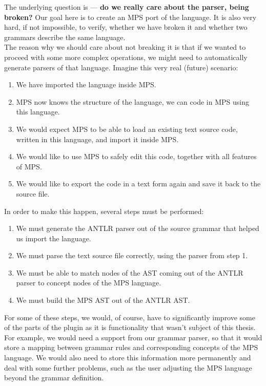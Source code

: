 The underlying question is --- \textbf{do we really care about the parser, being broken?}
Our goal here is to create an MPS port of the language.
It is also very hard, if not impossible, to verify, whether we have broken it and whether two grammars describe the same language.
\\

The reason why we should care about not breaking it is that if we wanted to proceed with some more complex operations, we might need to automatically generate parsers of that language.
Imagine this very real (future) scenario:

\begin{enumerate}
	\item We have imported the language inside MPS.

	\item MPS now knows the structure of the language, we can code in MPS using this language.

	\item We would expect MPS to be able to load an existing text source code, written in this language, and import it inside MPS.

	\item We would like to use MPS to safely edit this code, together with all features of MPS.

	\item We would like to export the code in a text form again and save it back to the source file.
\end{enumerate}

\noindent
In order to make this happen, several steps must be performed:

\begin{enumerate}
	\item We must generate the ANTLR parser out of the source grammar that helped us import the language.

	\item We must parse the text source file correctly, using the parser from step 1.

	\item We must be able to match nodes of the AST coming out of the ANTLR parser to concept nodes of the MPS language.

	\item We must build the MPS AST out of the ANTLR AST.
\end{enumerate}

For some of these steps, we would, of course, have to significantly improve some of the parts of the plugin as it is functionality that wasn't subject of this thesis.
For example, we would need a support from our grammar parser, so that it would store a mapping between grammar rules and corresponding concepts of the MPS language.
We would also need to store this information more permanently and deal with some further problems, such as the user adjusting the MPS language beyond the grammar definition.
\\

